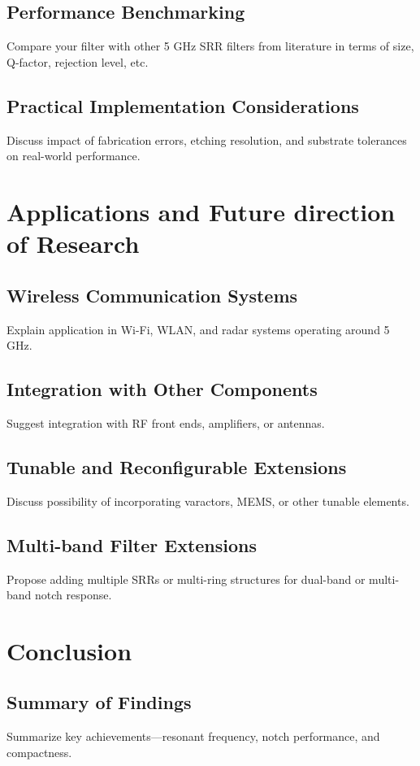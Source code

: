 \documentclass[conference]{IEEEtran}
\begin{document}
\subsection{Performance Benchmarking}
Compare your filter with other 5 GHz SRR filters from literature in terms of size, Q-factor, rejection level, etc.

\subsection{Practical Implementation Considerations}
Discuss impact of fabrication errors, etching resolution, and substrate tolerances on real-world performance.

\section{Applications and Future direction of Research}

\subsection{Wireless Communication Systems}
Explain application in Wi-Fi, WLAN, and radar systems operating around 5 GHz.

\subsection{Integration with Other Components}
Suggest integration with RF front ends, amplifiers, or antennas.

\subsection{Tunable and Reconfigurable Extensions}
Discuss possibility of incorporating varactors, MEMS, or other tunable elements.

\subsection{Multi-band Filter Extensions}
Propose adding multiple SRRs or multi-ring structures for dual-band or multi-band notch response.

\section{Conclusion}

\subsection{Summary of Findings}
Summarize key achievements—resonant frequency, notch performance, and compactness.
\end{document}
